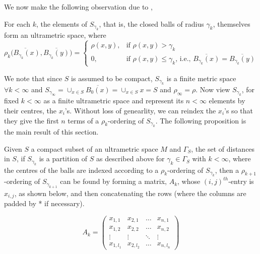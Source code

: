 We now make the following observation due to \cite{na},

\begin{lemma*}
For each $k$, the elements of $S_{\gamma_k}$, that is, the closed balls of radius $\gamma_k$, themselves form an ultrametric space, where 
\[ \rho_k\overline{(B_{\gamma_k}(x)},\overline{B_{\gamma_k}(y)}) = 
\begin{cases}
\rho(x,y), & \text{if } \rho(x,y) > \gamma_k \\
0, & \text{if }   \rho(x,y) \leq \gamma_k \text{, i.e., } \overline{B_{\gamma_k}(x)}=\overline{B_{\gamma_k}(y)}
\end{cases}
\]
\end{lemma*}

We note that since $S$ is assumed to be compact,  $S_{\gamma_k}$ is a finite metric space $\forall k < \infty$ and $S_{\gamma_\infty}=\cup_{x \in S}\overline{B_0(x)} = \cup_{x \in S}x=S$ and $\rho_\infty=\rho$.  Now view $S_{\gamma_k}$, for fixed $k < \infty$ as a finite ultrametric space and represent its $n < \infty$ elements by their centres, the $x_i$'s. Without loss of genearlity, we can reindex the $x_i$'s so that they give the first $n$ terms of a $\rho_k$-ordering of $S_{\gamma_k}$. The following proposition is the main result of this section.

\begin{proposition*}
Given $S$ a compact subset of an ultrametric space $M$ and $\Gamma_S$, the set of distances in $S$, if $S_{\gamma_k}$ is a partition of $S$ as described above for $\gamma_k \in \Gamma_S$ with $k < \infty$, where the centres of the balls are indexed according to a $\rho_k$-ordering of $S_{\gamma_k}$, then a $\rho_{k+1}$-ordering of $S_{\gamma_{k+1}}$ can be found by forming a matrix, $A_k$, whose $(i,j)^{th}$-entry is $x_{i,j}$, as shown below, and then concatenating the rows (where the columns are padded by * if necessary). 
\end{proposition*}

\[A_k=
 \begin{pmatrix}
  x_{1,1} & x_{2,1} & \ldots  &x_{n,1} \\
  x_{1,2} & x_{2,2} &\ldots &x_{n,2} \\
  \vdots & \vdots & \ddots & \vdots \\
  x_{1,l_1} & x_{2,l_2} & \ldots &x_{n,l_n}
 \end{pmatrix}
\]


